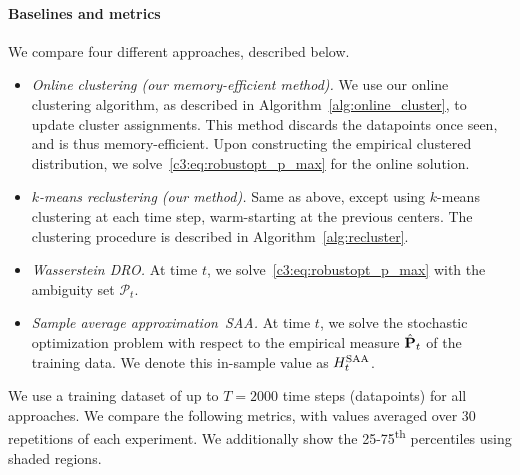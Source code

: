 \paragraph{Baselines and metrics}
We compare four different approaches, described below. 
\begin{itemize}
    \item \textit{Online clustering (our memory-efficient method).}
    We use our online clustering algorithm,  as described in Algorithm~\ref{alg:online_cluster}, to update cluster assignments. This method discards the datapoints once seen, and is thus memory-efficient. Upon constructing the empirical clustered distribution, we solve~\eqref{c3:eq:robustopt_p_max}  for the online solution.
    
    \item \textit{$k$-means reclustering (our method).}
    Same as above, except using $k$-means clustering at each time step, warm-starting at the previous centers.  The clustering procedure is described in Algorithm~\ref{alg:recluster}.

    \item \textit{Wasserstein \gls{DRO}.}
    At time $t$, we solve~\eqref{c3:eq:robustopt_p_max} with the ambiguity set $\mathcal{P}_{t}$.

    \item \textit{Sample average approximation~\gls{SAA}.}
    At time $t$, we solve the stochastic optimization problem with respect to the empirical measure $\hat{{\mathbf P}}_{t}$ of the training data. We denote this in-sample value as $H^{\rm SAA}_t$.
\end{itemize}
We use a training dataset of up to $T = 2000$ time steps (datapoints) for all approaches.
We compare the following metrics, with values averaged over 30 repetitions of each experiment. We additionally show the 25-75\textsuperscript{th} percentiles using shaded regions. 
